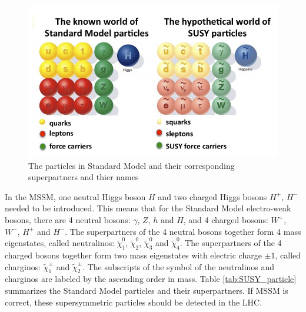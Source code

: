 \begin{figure}
\centering
\includegraphics[width=\textwidth]{data/photo/theory/SM-SUSY-diagram.jpg}
\caption{The particles in Standard Model and their corresponding superpartners and thier names}
\label{fig:SUSY_particles}
\end{figure}

In the MSSM, one neutral Higgs boson $H$ and two charged Higgs bosons $H^+$, $H^-$ needed to be introduced.
This means that for the Standard Model electro-weak bosons, there are 4 neutral bosons: $\gamma$, $Z$, $h$ and $H$, and 4 charged bosons: $W^+$, $W^-$, $H^+$ and $H^-$.
The superpartners of the 4 neutral bosons together form 4 mass eigenstates, called neutralinos: $\tilde{\chi}_1^0$, $\tilde{\chi}_2^0$, $\tilde{\chi}_3^0$ and $\tilde{\chi}_4^0$.
The superpartners of the 4 charged bosons together form two mass eigenstates with electric charge $\pm 1$, called charginos: $\tilde{\chi}_1^\pm$ and $\tilde{\chi}_2^\pm$.
The subscripts of the symbol of the neutralinos and charginos are labeled by the ascending order in mass.
Table \ref{tab:SUSY_particle} summarizes the Standard Model particles and their superpartners.
If MSSM is correct, these supersymmetric particles should be detected in the LHC.

